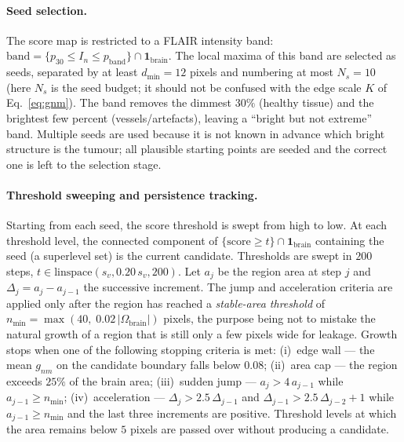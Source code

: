 \documentclass[11pt,a4paper]{article}
\begin{document}
\paragraph{Seed selection.} The score map is restricted to a FLAIR intensity
band: $\text{band}=\{p_{30}\le I_n\le p_{\text{band}}\}\cap\mathbf{1}_{\text{brain}}$.
The local maxima of this band are selected as seeds, separated by at least
$d_{\min}=12$ pixels and numbering at most $N_s=10$ (here $N_s$ is the seed
budget; it should not be confused with the edge scale $K$ of
Eq.~\eqref{eq:gnm}). The band removes the dimmest $30\%$ (healthy tissue) and the
brightest few percent (vessels/artefacts), leaving a ``bright but not extreme''
band. Multiple seeds are used because it is not known in advance which bright
structure is the tumour; all plausible starting points are seeded and the correct
one is left to the selection stage.

\paragraph{Threshold sweeping and persistence tracking.} Starting from each seed,
the score threshold is swept from high to low. At each threshold level, the
connected component of $\{\mathrm{score}\ge t\}\cap\mathbf{1}_{\text{brain}}$
containing the seed (a superlevel set) is the current candidate. Thresholds are
swept in $200$ steps, $t\in\text{linspace}(s_v, 0.20\,s_v, 200)$. Let $a_j$ be the
region area at step $j$ and $\Delta_j=a_j-a_{j-1}$ the successive increment. The
jump and acceleration criteria are applied only after the region has reached a
\emph{stable-area threshold} of $n_{\min}=\max(40,\;0.02\,|\Omega_{\text{brain}}|)$
pixels, the purpose being not to mistake the natural growth of a region that is
still only a few pixels wide for leakage. Growth stops when one of the following
stopping criteria is met: (i)~edge wall --- the mean $g_{nm}$ on the candidate
boundary falls below $0.08$; (ii)~area cap --- the region exceeds $25\%$ of the
brain area; (iii)~sudden jump --- $a_j>4\,a_{j-1}$ while $a_{j-1}\ge n_{\min}$;
(iv)~acceleration --- $\Delta_j>2.5\,\Delta_{j-1}$ and
$\Delta_{j-1}>2.5\,\Delta_{j-2}+1$ while $a_{j-1}\ge n_{\min}$ and the last three
increments are positive. Threshold levels at which the area remains below $5$
pixels are passed over without producing a candidate.
\end{document}
